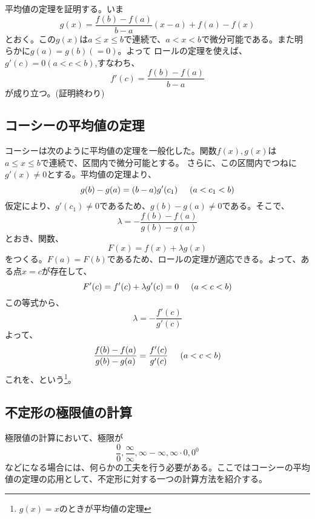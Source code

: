 \documentclass[a4j,dvipdfmx]{jsarticle}
\begin{document}
平均値の定理を証明する。いま
\begin{equation*}
    g(x)=\frac{f(b)-f(a)}{b-a}(x-a)+f(a)-f(x)
\end{equation*}
とおく。この$g(x)$は$a\leq x\leq b$で連続で、$a<x<b$で微分可能である。また明らかに$g(a)=g(b)(=0)$。よって
ロールの定理を使えば、$g'(c)=0(a<c<b)$,すなわち、
\begin{equation*}
    f'(c)=\frac{f(b)-f(a)}{b-a}
\end{equation*}
が成り立つ。(証明終わり)
\newpage
\subsection{コーシーの平均値の定理}
コーシーは次のように平均値の定理を一般化した。関数$f(x),g(x)$は$a\leq x\leq b$で連続で、区間内で微分可能とする。
さらに、この区間内でつねに$g'(x)\neq 0$とする。平均値の定理より、
\begin{equation*}
    g(b)-g(a)=(b-a)g'(c_1)\hspace*{5mm}(a<c_1<b)
\end{equation*}
仮定により、$g'(c_1)\neq0$であるため、$g(b)-g(a)\neq0$である。そこで、
\begin{equation*}
    \lambda = -\frac{f(b)-f(a)}{g(b)-g(a)}
\end{equation*}
とおき、関数、
\begin{equation*}
    F(x)=f(x)+\lambda g(x)
\end{equation*}
をつくる。$F(a)=F(b)$であるため、ロールの定理が適応できる。よって、ある点$x=c$が存在して、
\begin{equation*}
    F'(c)=f'(c)+\lambda g'(c)=0\hspace*{5mm}(a<c<b)
\end{equation*}
この等式から、
\begin{equation*}
    \lambda = -\frac{f'(c)}{g'(c)}
\end{equation*}
よって、
\begin{equation*}
    \frac{f(b)-f(a)}{g(b)-g(a)}=\frac{f'(c)}{g'(c)}\hspace*{5mm}(a<c<b)
\end{equation*}
これを、という\footnote{$g(x)=x$のときが平均値の定理}。
\subsection{不定形の極限値の計算}
極限値の計算において、極限が
\begin{equation*}
    \frac{0}{0},\frac{\infty}{\infty},\infty-\infty,\infty\cdot 0,0^0
\end{equation*}
などになる場合には、何らかの工夫を行う必要がある。ここではコーシーの平均値の定理の応用として、不定形に対する一つの計算方法を紹介する。
\end{document}

